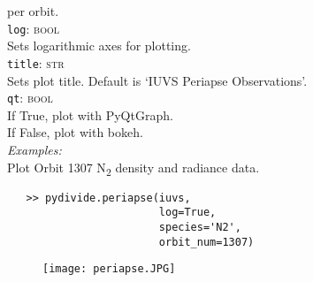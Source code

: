 \documentclass{article}
\begin{document}
\indent \indent per orbit.\\
\indent \texttt{log}: \textsc{bool}\\
\indent \indent Sets logarithmic axes for plotting.\\
\indent \texttt{title}: \textsc{str}\\
\indent \indent Sets plot title. Default is `IUVS Periapse Observations'.\\
\indent \texttt{qt}: \textsc{bool}\\
\indent \indent If True, plot with PyQtGraph.\\
\indent \indent If False, plot with bokeh.\\
\noindent \textit{Examples:}\\
\indent Plot Orbit 1307 N\textsubscript{2} density and radiance data.\\
\vspace{-10mm}
\begin{verbatim}
   >> pydivide.periapse(iuvs,
                        log=True,
                        species='N2',
                        orbit_num=1307)
\end{verbatim}
\begin{figure}[H]
\centering
\texttt{[image: periapse.JPG]}
\end{figure}
\end{document}

